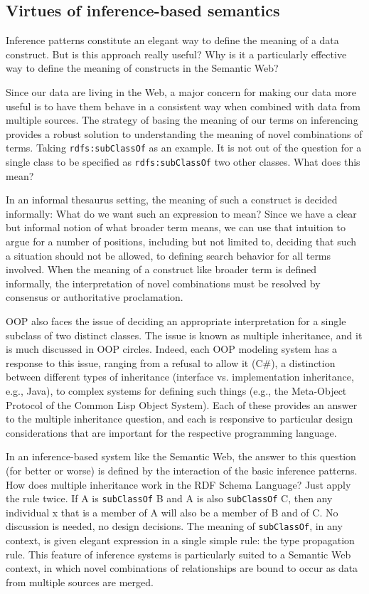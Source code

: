 \subsection{Virtues of inference-based semantics}

Inference patterns constitute an elegant way to define the meaning of a
data construct. But is this approach really useful? Why is it a
particularly effective way to define the meaning of constructs in the
Semantic Web?

Since our data are living in the Web, a major concern for making our
data more useful is to have them behave in a consistent way when
combined with data from multiple sources. The strategy of basing the
meaning of our terms on inferencing provides a robust solution to
understanding the meaning of novel combinations of terms. Taking
\texttt{rdfs:subClassOf} as an example. It is not out of the question for a single
class to be specified as \texttt{rdfs:subClassOf} two other classes. What does this
mean?

In an informal thesaurus setting, the meaning of such a construct is
decided informally: What do we
want such an expression to mean? Since we have a clear but informal
notion of what broader term means, we can use that intuition to argue
for a number of positions, including but not limited to, deciding that
such a situation should not be allowed, to defining search behavior for
all terms involved. When the meaning of a construct like broader term is
defined informally, the interpretation of novel combinations must be
resolved by consensus or authoritative proclamation.


\begin{sidebar}{}
OOP also faces the issue of deciding an appropriate interpretation for a
single subclass of two distinct classes. The issue is known as multiple
inheritance, and it is much discussed in OOP circles. Indeed, each OOP
modeling system has a response to this issue, ranging from a refusal to
allow it (C\#), a distinction between different types of inheritance
(interface vs. implementation inheritance, e.g., Java), to complex
systems for defining such things (e.g., the Meta-Object Protocol of the
Common Lisp Object System). Each of these provides an answer to the
multiple inheritance question, and each is responsive to particular
design considerations that are important for the respective programming
language.
\end{sidebar}

In an inference-based system like the Semantic Web, the answer to this
question (for better or worse) is defined by the interaction of the
basic inference patterns. How does multiple inheritance work in the RDF
Schema Language? Just apply the rule twice. If A is \texttt{subClassOf} B and A
is also \texttt{subClassOf} C, then any individual x that is a member of A will
also be a member of B and of C. No discussion is needed, no design
decisions. The meaning of \texttt{subClassOf}, in any context, is given elegant
expression in a single simple rule: the type propagation rule. This
feature of inference systems is particularly suited to a Semantic Web
context, in which novel combinations of relationships are bound to occur
as data from multiple sources are merged.

